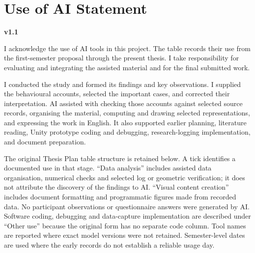 \frontmatter
\chapter*{Use of AI Statement}
\noindent\textbf{v1.1}

I acknowledge the use of AI tools in this project. The table records their use from the first-semester proposal through the present thesis. I take responsibility for evaluating and integrating the assisted material and for the final submitted work.

I conducted the study and formed its findings and key observations. I supplied the behavioural accounts, selected the important cases, and corrected their interpretation. AI assisted with checking those accounts against selected source records, organising the material, computing and drawing selected representations, and expressing the work in English. It also supported earlier planning, literature reading, Unity prototype coding and debugging, research-logging implementation, and document preparation.

The original Thesis Plan table structure is retained below. A tick identifies a documented use in that stage. ``Data analysis'' includes assisted data organisation, numerical checks and selected log or geometric verification; it does not attribute the discovery of the findings to AI. ``Visual content creation'' includes document formatting and programmatic figures made from recorded data. No participant observations or questionnaire answers were generated by AI. Software coding, debugging and data-capture implementation are described under ``Other use'' because the original form has no separate code column. Tool names are reported where exact model versions were not retained. Semester-level dates are used where the early records do not establish a reliable usage day.

